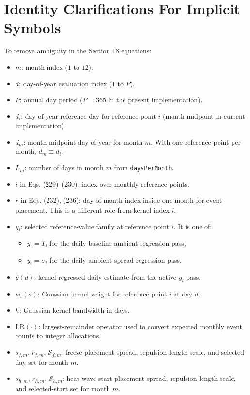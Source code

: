 \documentclass[11pt]{article}
\begin{document}
\section{Identity Clarifications For Implicit Symbols}
To remove ambiguity in the Section 18 equations:
\begin{itemize}[leftmargin=*]
\item \(m\): month index (\(1\) to \(12\)).
\item \(d\): day-of-year evaluation index (\(1\) to \(P\)).
\item \(P\): annual day period (\(P=365\) in the present implementation).
\item \(d_i\): day-of-year reference day for reference point \(i\) (month midpoint in current implementation).
\item \(d_m\): month-midpoint day-of-year for month \(m\). With one reference point per month, \(d_m\equiv d_i\).
\item \(L_m\): number of days in month \(m\) from \texttt{daysPerMonth}.
\item \(i\) in Eqs. (229)--(230): index over monthly reference points.
\item \(r\) in Eqs. (232), (236): day-of-month index inside one month for event placement. This is a different role from kernel index \(i\).
\item \(y_i\): selected reference-value family at reference point \(i\). It is one of:
\begin{itemize}[leftmargin=*]
\item \(y_i=\bar T_i\) for the daily baseline ambient regression pass,
\item \(y_i=\sigma_i\) for the daily ambient-spread regression pass.
\end{itemize}
\item \(\hat y(d)\): kernel-regressed daily estimate from the active \(y_i\) pass.
\item \(w_i(d)\): Gaussian kernel weight for reference point \(i\) at day \(d\).
\item \(h\): Gaussian kernel bandwidth in days.
\item \(\mathrm{LR}(\cdot)\): largest-remainder operator used to convert expected monthly event counts to integer allocations.
\item \(s_{f,m}\), \(r_{f,m}\), \(\mathcal{S}_{f,m}\): freeze placement spread, repulsion length scale, and selected-day set for month \(m\).
\item \(s_{h,m}\), \(r_{h,m}\), \(\mathcal{S}_{h,m}\): heat-wave start placement spread, repulsion length scale, and selected-start set for month \(m\).

\end{itemize}
\end{document}
